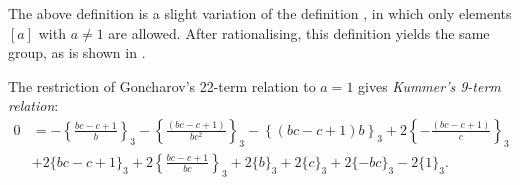 \documentclass[a4paper]{amsart}
\begin{document}
\begin{remark}
The above definition is a slight variation of the definition \cite[p.30]{Gon95b}, in which only elements $[a]$ with $a\neq 1$ are allowed. After rationalising, this definition yields the same group, as is shown in \cite[\S 5.3]{Gon95b}.
\end{remark}

\begin{remark}
The restriction of Goncharov's 22-term relation to $a=1$ gives  \emph{Kummer's 9-term relation}:
\begin{equation}\label{eqn: 9 term in B3}
\begin{aligned}
 0&=-\left\{\frac{bc-c+1}{b}\right\}_3-\left\{\frac{(bc-c+1)}{bc^2}\right\}_3-\left\{(bc-c+1)b\right\}_3+ 2\left\{-\frac{(bc-c+1)}{c}\right\}_3 \\ 
 &+2\{bc-c+1\}_3+2\left\{\frac{bc-c+1}{bc}\right\}_3
+2\{b\}_3+2\{c\}_3+2\{-bc\}_3-2\{1\}_3.
\end{aligned}
\end{equation}
\end{remark}
\end{document}
